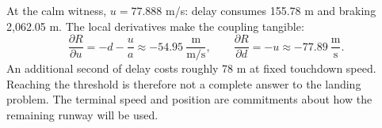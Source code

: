 
At the calm witness, $u=77.888$ m/s: delay consumes 155.78 m and braking 2,062.05 m. The local derivatives make the coupling tangible:
\begin{equation}
\frac{\partial R}{\partial u}=-d-\frac{u}{a}\approx-54.95\ \frac{\mathrm m}{\mathrm{m/s}},
\qquad \frac{\partial R}{\partial d}=-u\approx-77.89\ \frac{\mathrm m}{\mathrm s}.
\end{equation}
An additional second of delay costs roughly 78 m at fixed touchdown speed. Reaching the threshold is therefore not a complete answer to the landing problem. The terminal speed and position are commitments about how the remaining runway will be used.
\par\medskip
